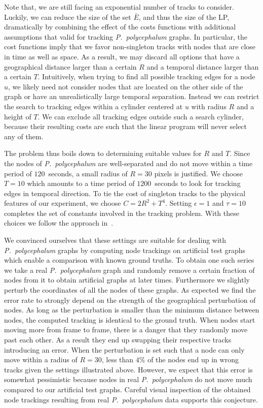 	      Note that, we are still facing an exponential number of tracks to consider. Luckily, we can reduce the size of the set $\bar{E}$, and thus the size of the LP, dramatically by combining the effect of the costs functions with additional assumptions that valid for tracking \emph{P.~polycephalum} graphs. In particular, the cost functions imply that we favor non-singleton tracks with nodes that are close in time as well as space. As a result, we may discard all options that have a geographical distance larger than a certain $R$ and a temporal distance larger than a certain $T$. Intuitively, when trying to find all possible tracking edges for a node $u$, we likely need not consider nodes that are located on the other side of the graph or have an unrealistically large temporal separation. Instead we can restrict the search to tracking edges within a cylinder centered at $u$ with radius $R$ and a height of $T$. We can exclude all tracking edges outside such a search cylinder, because their resulting costs are such that the linear program will never select any of them. 

	      The problem thus boils down to determining suitable values for $R$ and $T$. Since the nodes of \emph{P.~polycephalum} are well-separated and do not move within a time period of $120$~seconds, a small radius of $R = 30$ pixels is justified. We choose $T = 10$ which amounts to a time period of $1200$~seconds to look for tracking edges in temporal direction. To tie the cost of singleton tracks to the physical features of our experiment, we choose $ C = 2 R^2 + T^4$. Setting $\epsilon =1$ and $\tau = 10$ completes the set of constants involved in the tracking problem. With these choices we follow the approach in~\cite{Karrenbauer2013}.

	      We convinced ourselves that these settings are suitable for dealing with \emph{P.~polycephalum} graphs by computing node trackings on artificial test graphs which enable a comparison with known ground truths. To obtain one such series we take a real \emph{P.~polycephalum} graph and randomly remove a certain fraction of nodes from it to obtain artificial graphs at later times. Furthermore we slightly perturb the coordinates of all the nodes of these graphs. As expected we find the error rate to strongly depend on the strength of the geographical perturbation of nodes. As long as the perturbation is smaller than the minimum distance between nodes, the computed tracking is identical to the ground truth. When nodes start moving more from frame to frame, there is a danger that they randomly move past each other. As a result they end up swapping their respective tracks introducing an error. When the perturbation is set such that a node can only move within a radius of $R=30$, less than $4\%$ of the nodes end up in wrong tracks given the settings illustrated above. However, we expect that this error is somewhat pessimistic because nodes in real \emph{P.~polycephalum} do not move much compared to our artificial test graphs. Careful visual inspection of the obtained node trackings resulting from real \emph{P.~polycephalum} data supports this conjecture.

